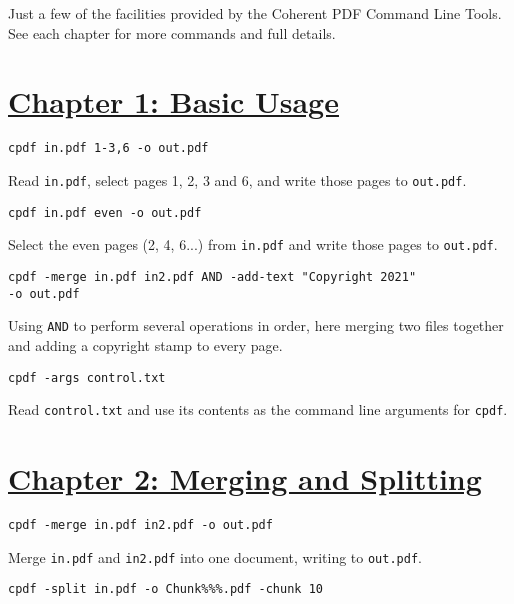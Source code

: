 \documentclass{book}
\begin{document}
Just a few of the facilities provided by the Coherent PDF Command Line Tools. See each chapter for more commands and full details.

\section*{\hyperref[chap:1]{Chapter 1: Basic Usage}}

\begin{framed}\noindent\texttt{cpdf in.pdf 1-3,6 -o out.pdf}\end{framed}

\noindent Read \texttt{in.pdf}, select pages 1, 2, 3 and 6, and write those pages to \texttt{out.pdf}.


\begin{framed}\noindent\texttt{cpdf in.pdf even -o out.pdf}\end{framed}
                  
\noindent Select the even pages (2, 4, 6...) from \texttt{in.pdf} and write those pages to \texttt{out.pdf}.

\begin{framed}\noindent\texttt{cpdf -merge in.pdf in2.pdf AND -add-text "Copyright 2021"\\\phantom{\ \ \ \ } -o out.pdf}\end{framed}

\noindent Using \texttt{AND} to perform several operations in order, here merging two files together and adding a copyright stamp to every page.

\begin{framed}\noindent\texttt{cpdf -args control.txt}\end{framed}

\noindent Read \texttt{control.txt} and use its contents as the command line arguments for \texttt{cpdf}.

\section*{\hyperref[chap:2]{Chapter 2: Merging and Splitting}}

\begin{framed}\noindent\texttt{cpdf -merge in.pdf in2.pdf -o out.pdf}\end{framed}

\noindent Merge \texttt{in.pdf} and \texttt{in2.pdf} into one document, writing to \texttt{out.pdf}.

\begin{framed}\noindent\texttt{cpdf -split in.pdf -o Chunk\%\%\%.pdf -chunk 10}\end{framed}
\end{document}
